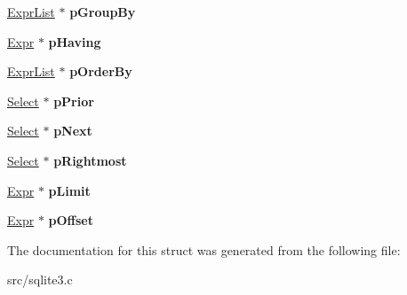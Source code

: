 \begin{DoxyCompactItemize}
\item 
\hypertarget{struct_select_a5b625c7495468ae56ca2f214a76231a0}{\hyperlink{struct_expr_list}{Expr\-List} $\ast$ {\bfseries p\-Group\-By}}\label{struct_select_a5b625c7495468ae56ca2f214a76231a0}

\item 
\hypertarget{struct_select_ad09e0b115e6e1599e3075b87dfa6e66e}{\hyperlink{struct_expr}{Expr} $\ast$ {\bfseries p\-Having}}\label{struct_select_ad09e0b115e6e1599e3075b87dfa6e66e}

\item 
\hypertarget{struct_select_a73c474cd4a9a9b9aa4e3187d8bf2d886}{\hyperlink{struct_expr_list}{Expr\-List} $\ast$ {\bfseries p\-Order\-By}}\label{struct_select_a73c474cd4a9a9b9aa4e3187d8bf2d886}

\item 
\hypertarget{struct_select_a51d1a253b0aba5a54b11b3bf3896d056}{\hyperlink{struct_select}{Select} $\ast$ {\bfseries p\-Prior}}\label{struct_select_a51d1a253b0aba5a54b11b3bf3896d056}

\item 
\hypertarget{struct_select_a96aa0caf60390b8f5e88589639205c40}{\hyperlink{struct_select}{Select} $\ast$ {\bfseries p\-Next}}\label{struct_select_a96aa0caf60390b8f5e88589639205c40}

\item 
\hypertarget{struct_select_a6ee045fa4305f1d68be5bdc22555e624}{\hyperlink{struct_select}{Select} $\ast$ {\bfseries p\-Rightmost}}\label{struct_select_a6ee045fa4305f1d68be5bdc22555e624}

\item 
\hypertarget{struct_select_a11d3b48d04d58be818cdefb10aa061a0}{\hyperlink{struct_expr}{Expr} $\ast$ {\bfseries p\-Limit}}\label{struct_select_a11d3b48d04d58be818cdefb10aa061a0}

\item 
\hypertarget{struct_select_aeaf016a10203b911000354122562fb46}{\hyperlink{struct_expr}{Expr} $\ast$ {\bfseries p\-Offset}}\label{struct_select_aeaf016a10203b911000354122562fb46}

\end{DoxyCompactItemize}


The documentation for this struct was generated from the following file\-:\begin{DoxyCompactItemize}
\item 
src/sqlite3.\-c\end{DoxyCompactItemize}
